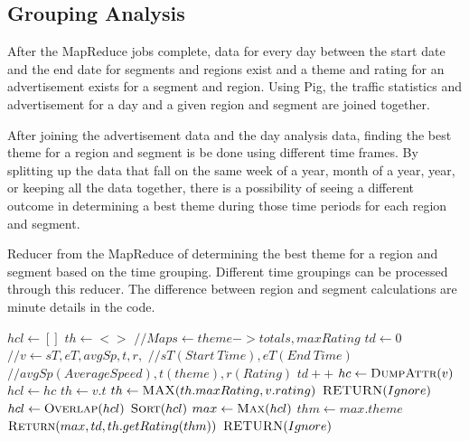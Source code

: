 \documentclass[titlepage,twocolumn]{article}
\begin{document}
\subsection{Grouping Analysis}
\label{sub:grpAnalysis}

\par After the MapReduce jobs complete, data for every day between the start date and the end date for segments and regions exist and a theme and rating for an advertisement exists for a segment and region. Using Pig, the traffic statistics and advertisement for a day and a given region and segment are joined together. 

\par After joining the advertisement data and the day analysis data, finding the best theme for a region and segment is be done using different time frames. By splitting up the data that fall on the same week of a year, month of a year, year, or keeping all the data together, there is a possibility of seeing a different outcome in determining a best theme during those time periods for each region and segment. 

\begin{algorithm}
	\small
	\caption{\small Reducer from the MapReduce of determining the best theme for a region and segment based on the time grouping. Different time groupings can be processed through this reducer. The difference between region and segment calculations are minute details in the code.}
	\label{alg:5}
	\begin{algorithmic}[1]
		\State $ hcl \gets [] $ 
		\State $ th \gets <> $ 
		\State $ // Maps \gets theme -> totals, maxRating $
		\State $ td \gets 0 $ 
			\State $ // v \gets sT, eT, avgSp, t, r, $
			\State $ // sT (Start\ Time), eT (End\ Time) $
			\State $ // avgSp (Average Speed), t (theme), r (Rating) $
			\State $ td++ $
				\State $ hc \gets \Call{DumpAttr}{v} $
				\State $ hcl \gets hc $
				\State $ th \gets v.t $
				\State $ th \gets \Call{MAX}{th.maxRating, v.rating} $
			\EndIf
		\EndFor
			\State $ \Call{RETURN}{Ignore} $
		\EndIf
		\State $ hcl \gets \Call{Overlap}{hcl} $ 
			\State $ \Call{Sort}{hcl} $
			\State $ max \gets \Call{Max}{hcl} $
			\State $ thm \gets max.theme $
			\State $ \Call{Return}{max, td, th.getRating(thm)} $
		\EndIf
		\State $ \Call{RETURN}{Ignore} $
		
		\EndProcedure
	\end{algorithmic}
\end{algorithm}
\end{document}
